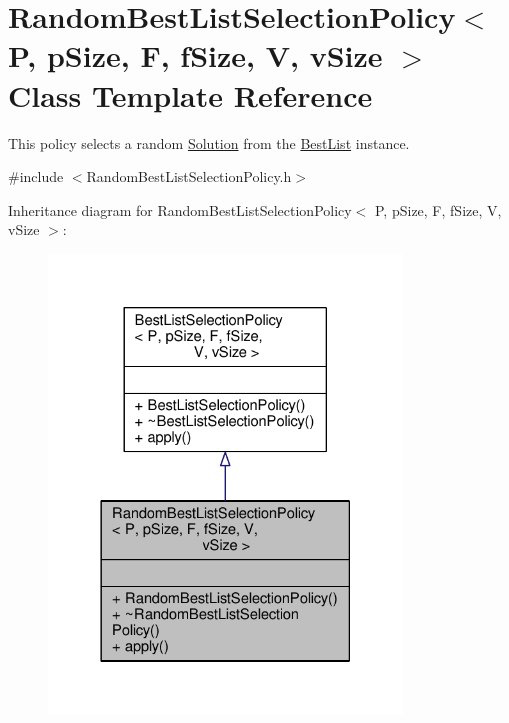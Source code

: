 \hypertarget{classRandomBestListSelectionPolicy}{}\section{Random\+Best\+List\+Selection\+Policy$<$ P, p\+Size, F, f\+Size, V, v\+Size $>$ Class Template Reference}
\label{classRandomBestListSelectionPolicy}


This policy selects a random \hyperlink{classSolution}{Solution} from the \hyperlink{classBestList}{Best\+List} instance.  




{\ttfamily \#include $<$Random\+Best\+List\+Selection\+Policy.\+h$>$}



Inheritance diagram for Random\+Best\+List\+Selection\+Policy$<$ P, p\+Size, F, f\+Size, V, v\+Size $>$\+:\nopagebreak
\begin{figure}[H]
\begin{center}
\leavevmode
\includegraphics[width=266pt]{classRandomBestListSelectionPolicy__inherit__graph}
\end{center}
\end{figure}


